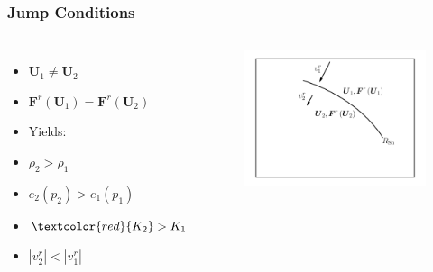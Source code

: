 \documentclass{beamer}
\newcommand{\red}{\textcolor{red}}
\newcommand{\bs}{\boldsymbol}
\begin{document}
\begin{frame}
\frametitle{Jump Conditions}

  \begin{columns}[c]


      \begin{itemize}[<+->]
        \item[]
          $\bs{U}_{1}\neq\bs{U}_{2}$
        \item[]
          $\bs{F}^{r}\left(\bs{U}_{1}\right)
          =\bs{F}^{r}\left(\bs{U}_{2}\right)$
        \item[]
          Yields:
        \item[]
          $\rho_{2}>\rho_{1}$
        \item[]
          $e_{2}\left(p_{2}\right)>e_{1}\left(p_{1}\right)$
        \item[]
          $\red{K_{2}}>K_{1}$
        \item[]
          $\left|v^{r}_{2}\right|<\left|v^{r}_{1}\right|$
      \end{itemize}


      \begin{figure}[htb!]
        \centering
        \includegraphics[width=\textwidth]{fig.jump.png}
      \end{figure}

  \end{columns}

\end{frame}
\end{document}
